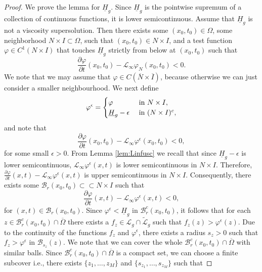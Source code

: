 \documentclass[11pt]{article}
\providecommand{\Linf}{\mathcal{L}_{\infty}}
\providecommand{\Ns}{N \times I}
\providecommand{\lps}{\underline{H}_g}
\providecommand{\lcg}{\mathcal{L}_g}
\numberwithin{equation}{section}
\theoremstyle{definition}
\begin{document}
\begin{proof}
    We prove the lemma for $\lps$. Since $\lps$ is the pointwise supremum of a collection of continuous functions, it is lower semicontinuous. Assume that $\lps$ is not a viscosity supersolution. Then there exists some $(x_0,t_0) \in \Omega $, some neighborhood $\Ns \subset \Omega$, such that $(x_0,t_0)\in \Ns$, and a test function $\varphi \in C^1(\Ns)$ that touches $\lps$ strictly from below at $(x_0,t_0)$ such that
    \begin{equation*}
        \frac{\partial \varphi}{\partial t}(x_0,t_0) - \Linf \varphi_{N}(x_0,t_0) < 0.
    \end{equation*}
    We note that we may assume that $\varphi \in C(\overline{N} \times \overline{I})$, because otherwise we can just consider a smaller neighbourhood. We next define
    \begin{align*}
   \varphi^{\epsilon} =  \begin{cases}
\varphi &  \textup{ in }  \Ns, \\
 \lps-\epsilon &  \textup{ in }  (N  \times I)^c,
\end{cases}
    \end{align*}
and note that 
\begin{equation*}
    \frac{\partial \varphi}{\partial t}(x_0,t_0) - \Linf \varphi^{\epsilon}(x_0,t_0) < 0,
\end{equation*}
for some small $\epsilon >0$.  From Lemma \ref{lem:Linfusc} we recall
    that since $\lps-\epsilon$ is lower semicontinuous, $\Linf \varphi^{\epsilon}(x,t)$ is lower semicontinuous in $\Ns$. Therefore, $\frac{\partial \varphi}{\partial t}(x,t) - \Linf \varphi^{\epsilon}(x,t)$ is upper semicontinuous in $\Ns$. Consequently, there exists some $\mathcal{B}_{r}(x_0, t_0) \subset \subset \Ns$ such that
 \begin{equation*}
   \frac{\partial \varphi}{\partial t}(x,t) - \Linf \varphi^{\epsilon}(x,t) < 0,  
   \end{equation*}
   for $(x,t)  \in \mathcal{B}_{r}(x_0,t_0)$. Since $\varphi^{\epsilon}<\lps$ in $\mathcal{B}_{r}^c(x_0,t_0)$, it follows that for each $z \in \mathcal{B}_{r}^c(x_0,t_0)  \cap \overline{\Omega}$ there exists a $f_z \in \lcg \cap \tilde{\mathcal{L}}_g$ such that $f_z(z) > \varphi^{\epsilon}(z)$. Due to the continuity of the functions $f_{z}$ and $\varphi^{\epsilon}$, there exists a radius $s_{z}>0$ such that $f_{z} > \varphi^{ \epsilon}$ in $ \mathcal{B}_{s_{z}}(z)$. We note that we can cover the whole $\mathcal{B}_{r}^c(x_0,t_0)  \cap \overline{\Omega}$ with similar balls. Since $\mathcal{B}_{r}^c(x_0,t_0)  \cap \overline{\Omega}$ is a compact set, we can choose a finite subcover i.e., there exists $\{ z_1,\hdots, z_M \}$ and $\{s_{z_1}, \hdots, s_{z_M} \}$ such that 

\end{proof}
\end{document}
